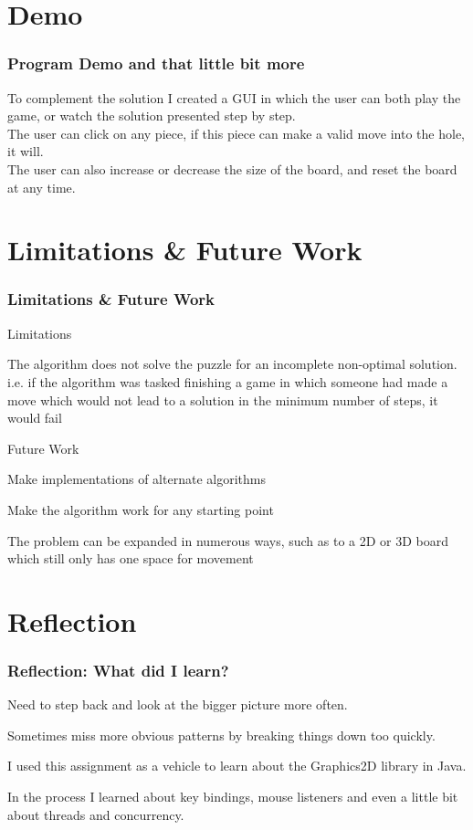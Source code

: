 \documentclass{beamer}
\begin{document}
\section{Demo}
	\begin{frame}
		\frametitle{Program Demo and that little bit more}
		To complement the solution I created a GUI in which the user can both play the game, or 
		watch the solution presented step by step. \\
		\vfill
		The user can click on any piece, if this piece can make a valid move into the hole, it will. \\
		\vfill
		The user can also increase or decrease the size of the board, and reset the board at any time. 
		
	\end{frame}
\section{Limitations \& Future Work}
	\begin{frame}
		\frametitle{Limitations \& Future Work}
		Limitations
		\blt
			\item The algorithm does not solve the puzzle for an incomplete non-optimal solution. \\
			\tab i.e. if the algorithm was tasked finishing a game in which someone had made a move which
			 would not lead to a solution in the minimum number of steps, it would fail
		\finblt
		
		Future Work
		\blt
			\item Make implementations of alternate algorithms 
			\item Make the algorithm work for any starting point
			\item The problem can be expanded in numerous ways, such as to a 2D or 3D board which still 
			only has one space for movement
			
		\finblt
	\end{frame}
\section{Reflection}
	\begin{frame}
		\frametitle{Reflection: What did I learn?}

		\blt
			\item Need to step back and look at the bigger picture more often. 
			\item Sometimes miss 
			more obvious patterns by breaking things down too quickly.
			\vfill
			\item I used this assignment as a vehicle to learn about the Graphics2D library in Java. 
			\item In the process I learned about key bindings, mouse listeners and even a little bit about 
			threads and concurrency. 
		\finblt
		

	\end{frame}
	
\end{document}
